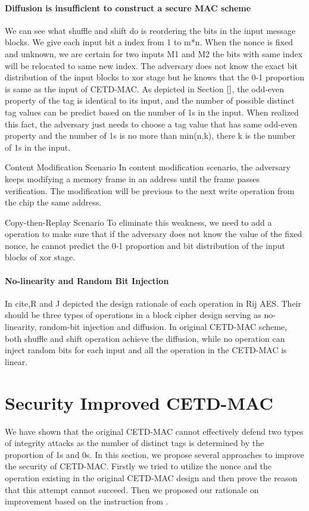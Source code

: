 \paragraph{Diffusion is insufficient to construct a secure MAC scheme}
We can see what shuffle and shift do is reordering the bits in the input message
blocks. We give each input bit a index from 1 to m*n. When the nonce is fixed
and unknown, we are certain for two inputs M1 and M2 the bits with same index
will be relocated to same new index. The adversary does not know the exact bit
distribution of the input blocks to xor stage but he knows that the 0-1
proportion is same as the input of CETD-MAC. As depicted in Section $\ref{}$, the odd-even property of the tag is identical to its input, and the number of possible distinct tag values can be predict based on the number of 1s in the input. When realized this fact, the adversary just needs to choose a tag value that has same odd-even property and the number of 1s is no more than min(n,k), there k is the number of 1s in the input.

Content Modification Scenario
In content modification scenario, the adversary keeps modifying a memory frame in an address until the frame passes verification. The modification will be previous to the next write operation from the chip the same address. 

Copy-then-Replay Scenario
To eliminate this weakness, we need to add a operation to make sure that if the adversary does not know the value of the fixed nonce, he cannot predict the 0-1 proportion and bit distribution of the input blocks of xor stage. 
%
\paragraph{No-linearity and Random Bit Injection}
In cite{},R and J depicted the design rationale of each operation in Rij AES. Their should be three types of operations in a block cipher design serving as no-linearity, random-bit injection and diffusion.  
In original CETD-MAC scheme, both shuffle and shift operation achieve the diffusion, while no operation can inject random bits for each input and all the operation in the CETD-MAC is linear.  

\section{Security Improved CETD-MAC}
We have shown that the original CETD-MAC cannot effectively defend two types of integrity attacks as the number of distinct tags is determined by the proportion of 1s and 0s. In this section, we propose several approaches to improve the security of CETD-MAC. Firstly we tried to utilize the nonce and the operation existing in the original CETD-MAC design and then prove the reason that this attempt cannot succeed. Then we proposed our rationale on improvement based on the instruction from \cite{}.  
